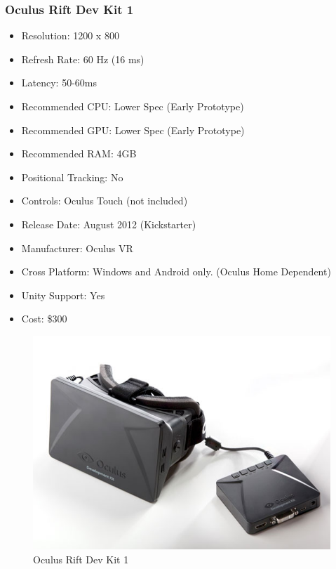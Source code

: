 \documentclass[a4paper,10pt,twoside]{article}
\begin{document}
\subsubsection{Oculus Rift Dev Kit 1}
\begin{itemize}
	\item Resolution: 1200 x 800
	\item Refresh Rate: 60 Hz (16 ms)
	\item Latency: 50-60ms
	\item Recommended CPU: Lower Spec (Early Prototype)
	\item Recommended GPU: Lower Spec (Early Prototype)
	\item Recommended RAM: 4GB
	\item Positional Tracking: No
	\item Controls: Oculus Touch (not included) 
	\item Release Date: August 2012 (Kickstarter)
	\item Manufacturer: Oculus VR
	\item Cross Platform: Windows and Android only. (Oculus Home Dependent)
	\item Unity Support: Yes
	\item Cost: \$300
\end{itemize}
	\begin{figure}[H]
	\includegraphics[width=\linewidth,height=\paperheight,keepaspectratio]{dk1.jpg}
	\caption{Oculus Rift Dev Kit 1}
	\label{fig:Riftdk1Img}
	\end{figure}
	\pagebreak
\end{document}
